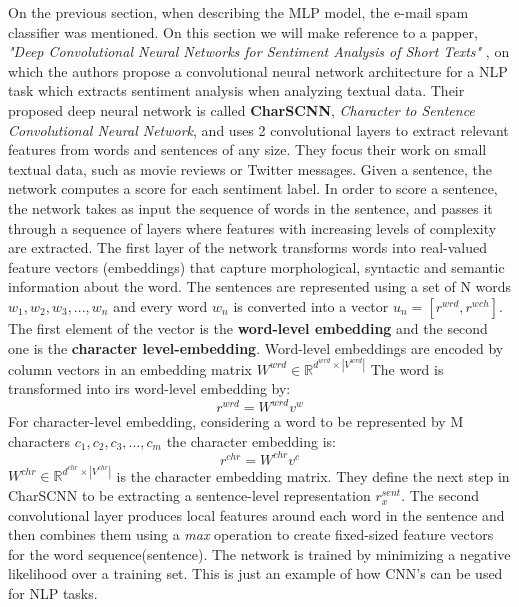 \documentclass{scrartcl}
\begin{document}
    On the previous section, when describing the MLP model, the e-mail spam classifier
    was mentioned. On this section we will make reference to a papper, 
    \textit{"Deep Convolutional Neural Networks for Sentiment Analysis of Short Texts"}
    \cite{dos-santos-gatti-2014-deep}, on which the authors propose a convolutional
    neural network architecture for a NLP task which extracts sentiment analysis when analyzing
    textual data.
    Their proposed deep neural network is called \textbf{CharSCNN}, 
    \textit{Character to Sentence Convolutional Neural Network}, and uses 2 convolutional layers
    to extract relevant features from words and sentences of any size. They focus their work 
    on small textual data, such as movie reviews or Twitter messages. 
    Given a sentence, the network computes a score for each sentiment label. 
    In order to score a sentence, the network takes as input the sequence of words in the sentence, 
    and passes it through  a sequence of layers where features with increasing levels of 
    complexity are extracted.
    The first layer of the network transforms words into real-valued feature vectors (embeddings) 
    that capture morphological, syntactic and semantic information about the word.
    The sentences are represented using a set of N words ${w_1, w_2, w_3, ..., w_n}$ and every
    word $w_n$ is converted into a vector $u_n = [r^{wrd}, r^{wch}]$. The first element of the 
    vector is the \textbf{word-level embedding} and the second one is the 
    \textbf{character level-embedding}.
    Word-level embeddings are encoded by column vectors in an embedding matrix 
    $W^{wrd} \in \mathbb{R}^{d^{wrd} \times | V^{wrd} | }$
    The word is transformed into irs word-level embedding by:
    \begin{equation}
        r^{wrd} = W^{wrd}v^{w}
    \end{equation}
    \newpage
    For character-level embedding, considering a word to be represented by M characters
    ${c_1, c_2, c_3, ..., c_m}$ the character embedding is:
    \begin{equation}
        r^{chr} = W^{chr}v^c
    \end{equation}
    $W^{chr} \in \mathbb{R}^{d^{chr} \times | V^{chr} | } $ is the character embedding matrix.
    They define the next step in CharSCNN to be extracting a sentence-level representation
    $r^{sent}_x$.
    The second convolutional layer produces local features around each word in the sentence
    and then combines them using a \textit{max} operation to create fixed-sized feature
    vectors for the word sequence(sentence). The network is trained by minimizing
    a negative likelihood over a training set. \newline
    This is just an example of how CNN's can be used for NLP tasks.

    \newpage
    \medskip
    
    
\end{document}
